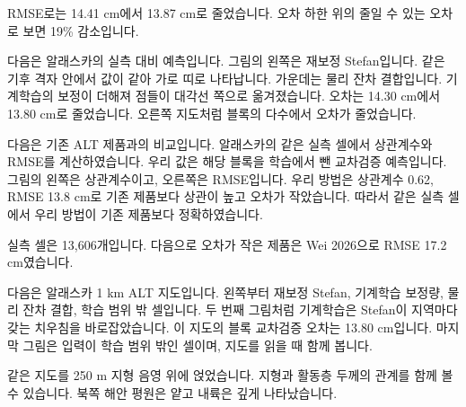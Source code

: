 
\begin{optbox}
RMSE로는 14.41 cm에서 13.87 cm로 줄었습니다. 오차 하한 위의 줄일 수 있는 오차로 보면 19\% 감소입니다.
\end{optbox}


다음은 알래스카의 실측 대비 예측입니다. 그림의 왼쪽은 재보정 Stefan입니다. 같은 기후 격자 안에서 값이 같아 가로 띠로 나타납니다. 가운데는 물리 잔차 결합입니다. 기계학습의 보정이 더해져 점들이 대각선 쪽으로 옮겨졌습니다. 오차는 14.30 cm에서 13.80 cm로 줄었습니다. 오른쪽 지도처럼 블록의 다수에서 오차가 줄었습니다.



다음은 기존 ALT 제품과의 비교입니다. 알래스카의 같은 실측 셀에서 상관계수와 RMSE를 계산하였습니다. 우리 값은 해당 블록을 학습에서 뺀 교차검증 예측입니다. 그림의 왼쪽은 상관계수이고, 오른쪽은 RMSE입니다. 우리 방법은 상관계수 0.62, RMSE 13.8 cm로 기존 제품보다 상관이 높고 오차가 작았습니다. 따라서 같은 실측 셀에서 우리 방법이 기존 제품보다 정확하였습니다.


\begin{optbox}
실측 셀은 13,606개입니다. 다음으로 오차가 작은 제품은 Wei 2026으로 RMSE 17.2 cm였습니다.
\end{optbox}


다음은 알래스카 1 km ALT 지도입니다. 왼쪽부터 재보정 Stefan, 기계학습 보정량, 물리 잔차 결합, 학습 범위 밖 셀입니다. 두 번째 그림처럼 기계학습은 Stefan이 지역마다 갖는 치우침을 바로잡았습니다. 이 지도의 블록 교차검증 오차는 13.80 cm입니다. 마지막 그림은 입력이 학습 범위 밖인 셀이며, 지도를 읽을 때 함께 봅니다.



같은 지도를 250 m 지형 음영 위에 얹었습니다. 지형과 활동층 두께의 관계를 함께 볼 수 있습니다. 북쪽 해안 평원은 얕고 내륙은 깊게 나타났습니다.


